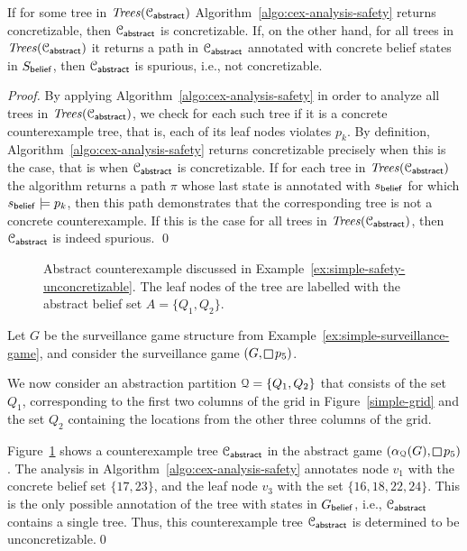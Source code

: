 \begin{thm}
If for some tree in $\mathit{Trees}(\mathcal{C}_{\mathsf{abstract}})$ Algorithm~\ref{algo:cex-analysis-safety} returns {\sc concretizable}, then $\mathcal{C}_{\mathsf{abstract}}$ is concretizable. If, on the other hand, for all trees in $\mathit{Trees}(\mathcal{C}_{\mathsf{abstract}})$ it returns a path in $\mathcal{C}_{\mathsf{abstract}}$ annotated with concrete belief states in $S_{\mathsf{belief}}$, then $\mathcal{C}_{\mathsf{abstract}}$ is spurious, i.e., not concretizable.
\end{thm}
\begin{proof}
By applying Algorithm~\ref{algo:cex-analysis-safety} in order to analyze all trees in $\mathit{Trees}(\mathcal{C}_{\mathsf{abstract}})$, we check for each such tree if it is a concrete counterexample tree, that is, each of its leaf nodes violates $p_k$. By definition, Algorithm~\ref{algo:cex-analysis-safety} returns {\sc concretizable} precisely when this is the case, that is when $\mathcal{C}_{\mathsf{abstract}}$ is concretizable. If for each tree in $\mathit{Trees}(\mathcal{C}_{\mathsf{abstract}})$ the algorithm returns a path $\pi$ whose last state is annotated with $s_{\mathsf{belief}}$ for which $s_{\mathsf{belief}} \models p_k$, then this path demonstrates that the corresponding tree is not a concrete counterexample. If this is the case for all trees in $\mathit{Trees}(\mathcal{C}_{\mathsf{abstract}})$, then $\mathcal{C}_{\mathsf{abstract}}$ is indeed spurious.
\qed
\end{proof}
\begin{figure}
\begin{center}

\end{center}

\caption{Abstract counterexample discussed in Example~\ref{ex:simple-safety-unconcretizable}. The leaf nodes of the tree are labelled with the abstract belief set $A = \{Q_1,Q_2\}$.}
\label{fig:simple-safety-counterex-1}

\end{figure}

\bigskip

\begin{eg}\label{ex:simple-safety-unconcretizable}
Let $G$ be the surveillance game structure from Example~\ref{ex:simple-surveillance-game}, and consider the surveillance game $(G,\LTLglobally p_5)$. 

We now consider an abstraction partition $\mathcal{Q} = \{Q_1,Q_2\}$ that consists of the set $Q_1$, corresponding to the first two columns of the grid in Figure~\ref{simple-grid} and the set $Q_2$ containing the locations from the other three columns of the grid.

Figure~\ref{fig:simple-safety-counterex-1} shows a counterexample tree $\mathcal{C}_{\mathsf{abstract}}$ in the abstract game $(\alpha_\partition(G),\LTLglobally p_5)$. The analysis in Algorithm~\ref{algo:cex-analysis-safety} annotates node $v_1$ with the concrete belief set $\{17,23\}$, and the leaf node $v_3$ with the set $\{16,18,22,24\}$. This is the only possible annotation of the tree with states in $G_{\mathsf{belief}}$, i.e., $\mathcal{C}_{\mathsf{abstract}}$ contains a single tree. Thus, this counterexample tree $\mathcal{C}_{\mathsf{abstract}}$ is determined to be unconcretizable.\qed
\end{eg}

